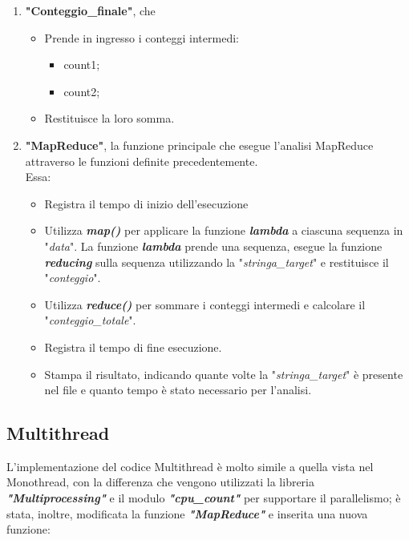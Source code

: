 \documentclass{article}
\begin{document}
\begin{enumerate}
        \item \textbf{"Conteggio\_finale"}, che
        \begin{itemize}
            \item Prende in ingresso i conteggi intermedi:
            \begin{itemize}
                \item count1;
                \item count2;
            \end{itemize}
            \item Restituisce la loro somma.
        \end{itemize}

        \item \textbf{"MapReduce"}, la funzione principale che esegue l'analisi MapReduce attraverso le funzioni definite precedentemente.
        \\Essa:
        \begin{itemize}
            \item Registra il tempo di inizio dell'esecuzione
            \item Utilizza \textbf{\textit{map()}} per applicare la funzione \textbf{\textit{lambda}} a ciascuna sequenza in "\textit{data}". La funzione \textbf{\textit{lambda}} prende una sequenza, esegue la funzione \textbf{\textit{reducing}} sulla sequenza utilizzando la "\textit{stringa\_target}" e restituisce il "\textit{conteggio}".
            \item Utilizza \textbf{\textit{reduce()}} per sommare i conteggi intermedi e calcolare il "\textit{conteggio\_totale}".
            \item Registra il tempo di fine esecuzione.
            \item Stampa il risultato, indicando quante volte la "\textit{stringa\_target}" è presente nel file e quanto tempo è stato necessario per l'analisi.
        \end{itemize}
    \end{enumerate}

    
    \vspace{10pt}
    
    

    \clearpage
    
    \subsection{Multithread}
    L'implementazione del codice Multithread è molto simile a quella vista nel Monothread, con la differenza che vengono utilizzati la libreria \textbf{\textit{"Multiprocessing"}} e il modulo \textbf{\textit{"cpu\_count"}} per supportare il parallelismo; è stata, inoltre, modificata la funzione \textbf{\textit{"MapReduce"}} e inserita una nuova funzione:
\end{document}

